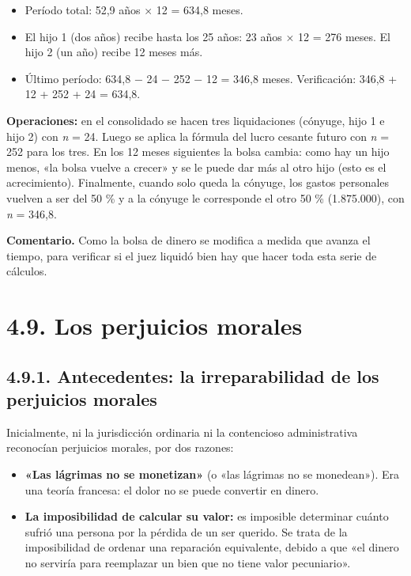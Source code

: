 \begin{itemize}
\item Período total: 52,9 años × 12 = 634,8 meses.
\item El hijo 1 (dos años) recibe hasta los 25 años: 23 años × 12 = 276 meses. El hijo 2 (un año) recibe 12 meses más.
\item Último período: 634,8 − 24 − 252 − 12 = 346,8 meses. Verificación: 346,8 + 12 + 252 + 24 = 634,8.
\end{itemize}
\textbf{Operaciones:} en el consolidado se hacen tres liquidaciones (cónyuge, hijo 1 e hijo 2) con \textit{n} = 24. Luego se aplica la fórmula del lucro cesante futuro con \textit{n} = 252 para los tres. En los 12 meses siguientes la bolsa cambia: como hay un hijo menos, «la bolsa vuelve a crecer» y se le puede dar más al otro hijo (esto es el acrecimiento). Finalmente, cuando solo queda la cónyuge, los gastos personales vuelven a ser del 50 \% y a la cónyuge le corresponde el otro 50 \% (1.875.000), con \textit{n} = 346,8.

\begin{comentario}
\textcolor[HTML]{8A6D3B}{\textbf{Comentario. }}Como la bolsa de dinero se modifica a medida que avanza el tiempo, para verificar si el juez liquidó bien hay que hacer toda esta serie de cálculos.
\end{comentario}
\section{4.9. Los perjuicios morales}
\subsection{4.9.1. Antecedentes: la irreparabilidad de los perjuicios morales}
Inicialmente, ni la jurisdicción ordinaria ni la contencioso administrativa reconocían perjuicios morales, por dos razones:

\begin{itemize}
\item \textbf{«Las lágrimas no se monetizan»} (o «las lágrimas no se monedean»). Era una teoría francesa: el dolor no se puede convertir en dinero.
\item \textbf{La imposibilidad de calcular su valor:} es imposible determinar cuánto sufrió una persona por la pérdida de un ser querido. Se trata de la imposibilidad de ordenar una reparación equivalente, debido a que «el dinero no serviría para reemplazar un bien que no tiene valor pecuniario».
\end{itemize}
